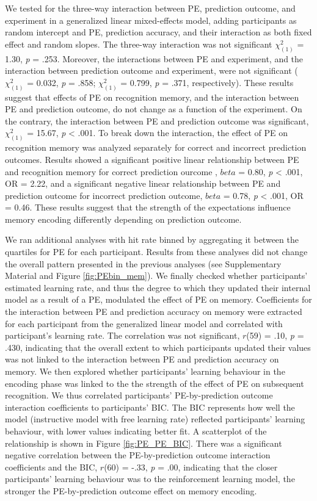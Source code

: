 \documentclass[a4paper,12pt]{article}
\begin{document}
We tested for the three-way interaction between PE, prediction outcome, and experiment in a generalized linear mixed-effects model, adding participants as random intercept and PE, prediction accuracy, and their interaction as both fixed effect and random slopes. 
The three-way interaction was not significant $\chi^2_{(1)}$ = 1.30, \textit{p} = .253. Moreover, the interactions between PE and experiment, and the interaction between prediction outcome and experiment, were not significant ($\chi^2_{(1)}$ = 0.032, \textit{p} = .858; $\chi^2_{(1)}$ = 0.799, \textit{p} = .371, respectively). These results suggest that effects of PE on recognition memory, and the interaction between PE and prediction outcome, do not change as a function of the experiment. On the contrary, the interaction between PE and prediction outcome was significant, $\chi^2_{(1)}$ = 15.67, \textit{p} < .001. To break down the interaction, the effect of PE on recognition memory was analyzed separately for correct and incorrect prediction outcomes. Results showed a significant positive linear relationship between PE and recognition memory for correct prediction ourcome , $beta$ = 0.80, \textit{p} < .001, OR = 2.22, and a significant negative linear relationship between PE and prediction outcome for incorrect prediction outcome, $beta$ = 0.78, \textit{p} < .001, OR = 0.46.
These results suggest that the strength of the expectations influence memory encoding differently depending on prediction outcome. \par

We ran additional analyses with hit rate binned by aggregating it between the quartiles for PE for each participant. Results from these analyses did not change the overall pattern presented in the previous analyses (see Supplementary Material and Figure \ref{fig:PEbin_mem}). We finally checked whether participants' estimated learning rate, and thus the  degree to which they updated their internal model as a result of a PE, modulated the effect of PE on memory. Coefficients for the interaction between PE and prediction accuracy on memory were extracted for each participant from the generalized linear model and correlated with participant's learning rate. The correlation was not significant,  $r$(59) = .10, \textit{p} = .430, indicating that the overall extent to which participants updated their values was not linked to the interaction between PE and prediction accuracy on memory. We then explored whether participants' learning behaviour in the encoding phase was linked to the the strength of the effect of PE on subsequent recognition. We thus correlated participants' PE-by-prediction outcome interaction coefficients to participants' BIC. The BIC represents how well the model (instructive model with free learning rate) reflected participants' learning behaviour, with lower values indicating better fit. A scatterplot of the relationship is shown in Figure \ref{fig:PE_PE_BIC}.
There was a significant negative correlation between the PE-by-prediction outcome interaction coefficients and the BIC,  $r$(60) = -.33, \textit{p} = .00, indicating that the closer participants' learning behaviour was to the reinforcement learning model, the stronger the PE-by-prediction outcome effect on memory encoding.
 
\end{document}
